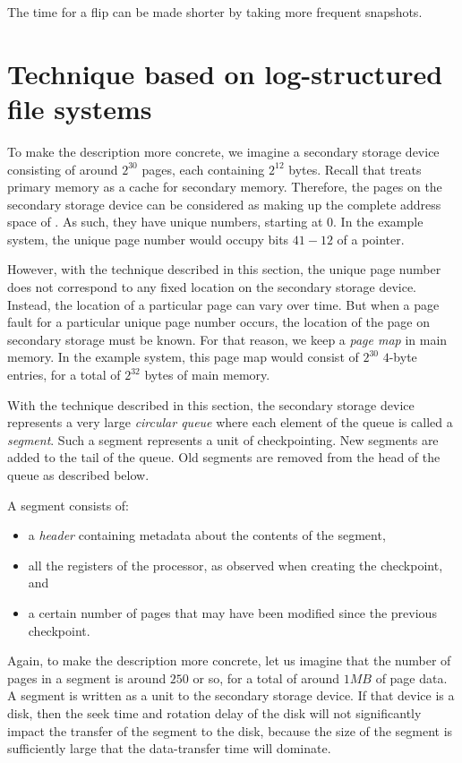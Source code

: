 The time for a flip can be made shorter by taking more frequent
snapshots.


\section{Technique based on log-structured file systems}

To make the description more concrete, we imagine a secondary storage
device consisting of around $2^{30}$ pages, each containing $2^{12}$
bytes.  Recall that \sysname{} treats primary memory as a cache for
secondary memory.  Therefore, the pages on the secondary storage
device can be considered as making up the complete address space of
\sysname{}.  As such, they have unique numbers, starting at $0$.
In the example system, the unique page number would occupy bits $41 -
12$ of a pointer.

However, with the technique described in this section, the unique page
number does not correspond to any fixed location on the secondary
storage device.  Instead, the location of a particular page can vary
over time.  But when a page fault for a particular unique page number
occurs, the location of the page on secondary storage must be known.
For that reason, we keep a \emph{page map} in main memory.  In the
example system, this page map would consist of $2^{30}$ $4$-byte
entries, for a total of $2^{32}$ bytes of main memory.

With the technique described in this section, the secondary storage
device represents a very large \emph{circular queue} where each
element of the queue is called a \emph{segment}.  Such a segment
represents a unit of checkpointing.  New segments are added to the
tail of the queue.  Old segments are removed from the head of the
queue as described below.

A segment consists of:

\begin{itemize}
\item a \emph{header} containing metadata about the contents of the
  segment,
\item all the registers of the processor, as observed when creating
  the checkpoint, and
\item a certain number of pages that may have been modified since the
  previous checkpoint.
\end{itemize}

Again, to make the description more concrete, let us imagine that the
number of pages in a segment is around $250$ or so, for a total of
around $1MB$ of page data.  A segment is written as a unit to the
secondary storage device.  If that device is a disk, then the seek
time and rotation delay of the disk will not significantly impact the
transfer of the segment to the disk, because the size of the segment
is sufficiently large that the data-transfer time will dominate.


